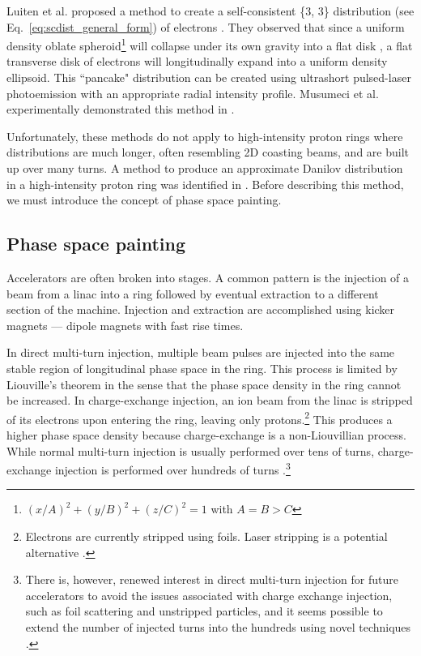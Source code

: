 Luiten et al. proposed a method to create a self-consistent \{3, 3\} distribution (see Eq.~\eqref{eq:scdist_general_form}) of electrons \cite{Luiten2004}. They observed that since a uniform density oblate spheroid\footnote{$(x/A)^2 + (y/B)^2 + (z/C)^2 = 1$ with $A = B > C$} will collapse under its own gravity into a flat disk \cite{Lin1965}, a flat transverse disk of electrons will longitudinally expand into a uniform density ellipsoid. This ``pancake" distribution can be created using ultrashort pulsed-laser photoemission with an appropriate radial intensity profile. Musumeci et al. experimentally demonstrated this method in \cite{Musumeci2008}. 

Unfortunately, these methods do not apply to high-intensity proton rings where distributions are much longer, often resembling 2D coasting beams, and are built up over many turns. A method to produce an approximate Danilov distribution in a high-intensity proton ring was identified in \cite{Danilov2003}. Before describing this method, we must introduce the concept of phase space painting. 


\subsection{Phase space painting}

Accelerators are often broken into stages. A common pattern is the injection of a beam from a linac into a ring followed by eventual extraction to a different section of the machine. Injection and extraction are accomplished using kicker magnets — dipole magnets with fast rise times.

In direct multi-turn injection, multiple beam pulses are injected into the same stable region of longitudinal phase space in the ring. This process is limited by Liouville's theorem in the sense that the phase space density in the ring cannot be increased. In charge-exchange injection, an ion beam from the linac is stripped of its electrons upon entering the ring, leaving only protons.\footnote{Electrons are currently stripped using foils. Laser stripping is a potential alternative \cite{Cousineau2017}.} This produces a higher phase space density because charge-exchange is a non-Liouvillian process. While normal multi-turn injection is usually performed over tens of turns, charge-exchange injection is performed over hundreds of turns \cite{Bracco2017}.\footnote{There is, however, renewed interest in direct multi-turn injection for future accelerators to avoid the issues associated with charge exchange injection, such as foil scattering and unstripped particles, and it seems possible to extend the number of injected turns into the hundreds using novel techniques \cite{Prior2016}.} 

